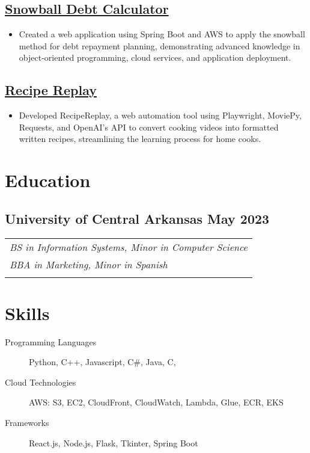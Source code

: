 \documentclass[9pt]{article}
\begin{document}
\subsection{\href{https://snowball-debt-calculator.click/}{Snowball Debt Calculator}}
\begin{itemize}
    \item Created a web application using Spring Boot and AWS to apply the snowball method for debt repayment planning, demonstrating advanced knowledge in object-oriented programming, cloud services, and application deployment.
\end{itemize}

\subsection{\href{https://github.com/kjgthecoder/RecipeReplay}{Recipe Replay}}
\begin{itemize}
    \item Developed RecipeReplay, a web automation tool using Playwright, MoviePy, Requests, and OpenAI's API to convert cooking videos into formatted written recipes, streamlining the learning process for home cooks.
\end{itemize}

\section{Education}
\subsection{University of Central Arkansas \hfill May 2023}
\begin{tabular}{@{}p{\textwidth}@{}}
    \textit{BS in Information Systems, Minor in Computer Science} \\
    \vspace{0.0em} %
    \textit{BBA in Marketing, Minor in Spanish} \\
    \vspace{0.0em} %
\end{tabular}

\section{Skills}
\begin{description}
    \item[Programming Languages] Python, C++, Javascript, C\#, Java, C,  
    \item[Cloud Technologies] AWS: S3, EC2, CloudFront, CloudWatch, Lambda, Glue, ECR, EKS
    \item[Frameworks] React.js, Node.js, Flask, Tkinter, Spring Boot
\end{description}
\end{document}

